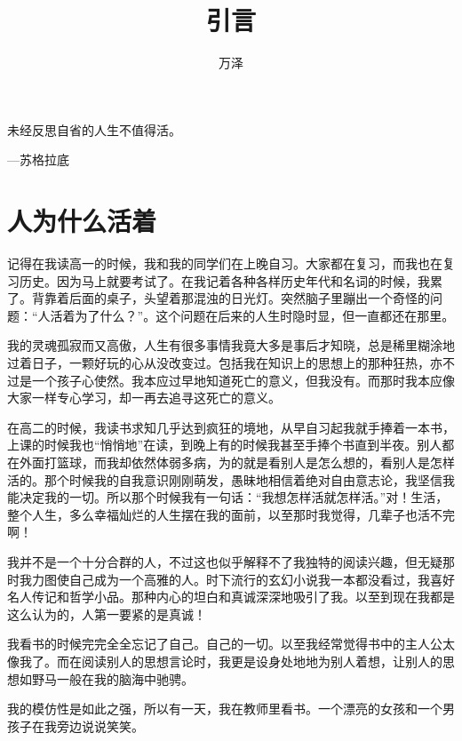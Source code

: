 \documentclass[12pt]{exam}%
\begin{document}
\begin{coverpages}
\title{引言}
\author{万泽}
\maketitle
\tableofcontents
\end{coverpages}
\begin{flushright}
\begin{notecard}[blue!30]{14em}
\ttfamily
未经反思自省的人生不值得活。

{\hfill\sffamily —苏格拉底}
\end{notecard}
\end{flushright}
\section{人为什么活着}
记得在我读高一的时候，我和我的同学们在上晚自习。大家都在复习，而我也在复习历史。因为马上就要考试了。在我记着各种各样历史年代和名词的时候，我累了。背靠着后面的桌子，头望着那混浊的日光灯。突然脑子里蹦出一个奇怪的问题：“人活着为了什么？”。这个问题在后来的人生时隐时显，但一直都还在那里。

我的灵魂孤寂而又高傲，人生有很多事情我竟大多是事后才知晓，总是稀里糊涂地过着日子，一颗好玩的心从没改变过。包括我在知识上的思想上的那种狂热，亦不过是一个孩子心使然。我本应过早地知道死亡的意义，但我没有。而那时我本应像大家一样专心学习，却一再去追寻这死亡的意义。

在高二的时候，我读书求知几乎达到疯狂的境地，从早自习起我就手捧着一本书，上课的时候我也“悄悄地”在读，到晚上有的时候我甚至手捧个书直到半夜。别人都在外面打篮球，而我却依然体弱多病，为的就是看别人是怎么想的，看别人是怎样活的。那个时候我的自我意识刚刚萌发，愚昧地相信着绝对自由意志论，我坚信我能决定我的一切。所以那个时候我有一句话：“我想怎样活就怎样活。”对！生活，整个人生，多么幸福灿烂的人生摆在我的面前，以至那时我觉得，几辈子也活不完啊！

我并不是一个十分合群的人，不过这也似乎解释不了我独特的阅读兴趣，但无疑那时我力图使自己成为一个高雅的人。时下流行的玄幻小说我一本都没看过，我喜好名人传记和哲学小品。那种内心的坦白和真诚深深地吸引了我。以至到现在我都是这么认为的，人第一要紧的是真诚！

我看书的时候完完全全忘记了自己。自己的一切。以至我经常觉得书中的主人公太像我了。而在阅读别人的思想言论时，我更是设身处地地为别人着想，让别人的思想如野马一般在我的脑海中驰骋。

我的模仿性是如此之强，所以有一天，我在教师里看书。一个漂亮的女孩和一个男孩子在我旁边说说笑笑。
\end{document}
